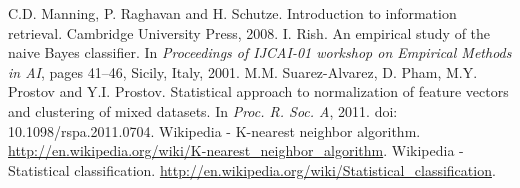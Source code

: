\documentclass{llncs}
\begin{document}
\begin{thebibliography}{99}
 C.D. Manning, P. Raghavan and H. Schutze. Introduction to information retrieval.  Cambridge University Press, 2008.  
 I. Rish. An empirical study of the naive Bayes classifier. In \emph{Proceedings of IJCAI-01 workshop on Empirical Methods in AI}, pages 41--46, Sicily, Italy, 2001.
 M.M. Suarez-Alvarez, D. Pham, M.Y. Prostov and Y.I. Prostov. Statistical approach to normalization of feature vectors and clustering of mixed datasets. In \emph{Proc. R. Soc. A}, 2011. doi: 10.1098/rspa.2011.0704. 
 Wikipedia - K-nearest neighbor algorithm. \url{http://en.wikipedia.org/wiki/K-nearest\_neighbor\_algorithm}.
 Wikipedia - Statistical classification. \url{http://en.wikipedia.org/wiki/Statistical\_classification}. 
\end{thebibliography}
\end{document}
